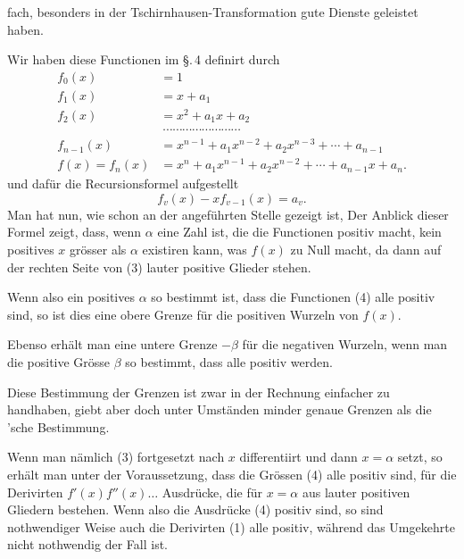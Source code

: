 fach, besonders in der Tschirnhausen-Transformation gute Dienste
geleistet haben.

Wir haben diese Functionen im \S.\,4 definirt durch
\[
\begin{aligned}
f_0(x) &= 1\\
f_1(x) &= x+a_1\\
f_2(x) &= x^2+a_1x+a_2\\
&\ \cdots\cdots\cdots\cdots\cdots\cdots\cdots\cdots\\
f_{n-1}(x) &= x^{n-1}+a_1x^{n-2}+a_2x^{n-3}+\cdots+a_{n-1}\\
f(x)=f_n(x) &= x^n+a_1x^{n-1}+a_2x^{n-2}+\cdots+a_{n-1}x+a_n.
\end{aligned}
\]
und dafür die Recursionsformel aufgestellt
\[
f_v(x)-xf_{v-1}(x)=a_v.
\]
Man hat nun, wie schon an der angeführten Stelle gezeigt ist,
Der Anblick dieser Formel zeigt, dass, wenn $\alpha$ eine Zahl ist, die
die Functionen
positiv macht, kein positives $x$ grösser als $\alpha$ existiren kann,
was $f(x)$ zu Null macht, da dann auf der rechten Seite von (3) lauter
positive Glieder stehen.

Wenn also ein positives $\alpha$ so bestimmt ist, dass die Functionen
(4) alle positiv sind, so ist dies eine obere Grenze für die positiven
Wurzeln von $f(x)$.

Ebenso erhält man eine untere Grenze $-\beta$ für die negativen Wurzeln,
wenn man die positive Grösse $\beta$ so bestimmt, dass
alle positiv werden.

Diese Bestimmung der Grenzen ist zwar in der Rechnung einfacher zu
handhaben, giebt aber doch unter Umständen minder genaue Grenzen als
die 'sche Bestimmung.

Wenn man nämlich (3) fortgesetzt nach $x$ differentiirt und dann
$x=\alpha$ setzt, so erhält man unter der Voraussetzung, dass die
Grössen (4) alle positiv sind, für die Derivirten $f'(x)f''(x)\ldots$
Ausdrücke, die für $x=\alpha$ aus lauter positiven Gliedern bestehen.
Wenn also die Ausdrücke (4) positiv sind, so sind nothwendiger Weise
auch die Derivirten (1) alle positiv, während das Umgekehrte nicht
nothwendig der Fall ist.
